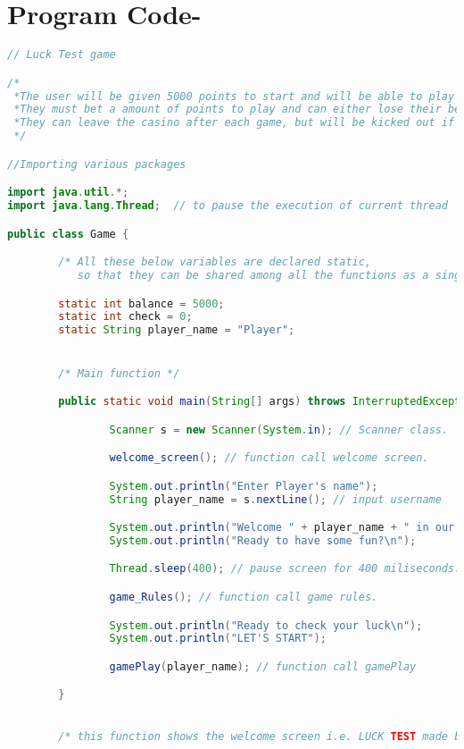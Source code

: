 \documentclass[]{article}
\begin{document}
\section{Program Code-}
\scriptsize
\begin{lstlisting}[language=Java]
// Luck Test game

/*
 *The user will be given 5000 points to start and will be able to play a variety of games.
 *They must bet a amount of points to play and can either lose their bet or win and gain points.
 *They can leave the casino after each game, but will be kicked out if they run out of points.
 */

//Importing various packages  

import java.util.*;       
import java.lang.Thread;  // to pause the execution of current thread 

public class Game {

        /* All these below variables are declared static,
           so that they can be shared among all the functions as a single copy. */

        static int balance = 5000;
        static int check = 0;
        static String player_name = "Player";


        /* Main function */

        public static void main(String[] args) throws InterruptedException {

                Scanner s = new Scanner(System.in); // Scanner class.         

                welcome_screen(); // function call welcome screen.          

                System.out.println("Enter Player's name");
                String player_name = s.nextLine(); // input username

                System.out.println("Welcome " + player_name + " in our game");
                System.out.println("Ready to have some fun?\n");

                Thread.sleep(400); // pause screen for 400 miliseconds.

                game_Rules(); // function call game rules.

                System.out.println("Ready to check your luck\n");
                System.out.println("LET'S START");

                gamePlay(player_name); // function call gamePlay

        }
        

        /* this function shows the welcome screen i.e. LUCK TEST made by using pattern '|' */


\end{lstlisting}
\end{document}
